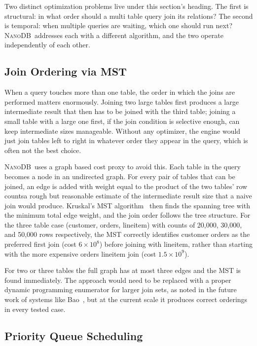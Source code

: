 \documentclass[conference]{IEEEtran}
\newcommand{\NanoDB}{\textsc{NanoDB}}
\begin{document}
Two distinct optimization problems live under this section's heading. The first
is structural: in what order should a multi table query join its relations? The
second is temporal: when multiple queries are waiting, which one should run next?
\NanoDB\ addresses each with a different algorithm, and the two operate
independently of each other.

\subsection{Join Ordering via MST}

When a query touches more than one table, the order in which the joins are
performed matters enormously. Joining two large tables first produces a large
intermediate result that then has to be joined with the third table; joining
a small table with a large one first, if the join condition is selective enough,
can keep intermediate sizes manageable. Without any optimizer, the engine would
just join tables left to right in whatever order they appear in the query, which
is often not the best choice.

\NanoDB\ uses a graph based cost proxy to avoid this. Each table in the query
becomes a node in an undirected graph. For every pair of tables that can be
joined, an edge is added with weight equal to the product of the two tables' row
countsa rough but reasonable estimate of the intermediate result size that a
naive join would produce. Kruskal's MST algorithm~\cite{cormen2022} then finds
the spanning tree with the minimum total edge weight, and the join order follows
the tree structure. For the three table case (customer, orders, lineitem) with
counts of 20,000, 30,000, and 50,000 rows respectively, the MST correctly
identifies customer orders as the preferred first join (cost $6\times10^8$)
before joining with lineitem, rather than starting with the more expensive
orders lineitem join (cost $1.5\times10^9$).

For two or three tables the full graph has at most three edges and the MST is
found immediately. The approach would need to be replaced with a proper dynamic
programming enumerator for larger join sets, as noted in the future work of
systems like Bao~\cite{marcus2021}, but at the current scale it produces correct
orderings in every tested case.

\subsection{Priority Queue Scheduling}
\end{document}
